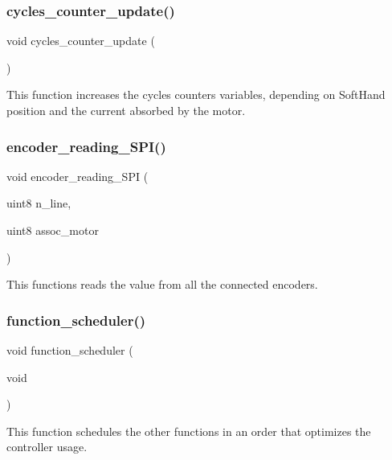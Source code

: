 \subsubsection{cycles\+\_\+counter\+\_\+update()}
{\footnotesize\ttfamily void cycles\+\_\+counter\+\_\+update (\begin{DoxyParamCaption}{ }\end{DoxyParamCaption})}

This function increases the cycles counters variables, depending on Soft\+Hand position and the current absorbed by the motor. \mbox{\label{interruptions_8h_a6eeedfdf03dd87bd2922b7005fd8c691}} 
\subsubsection{encoder\+\_\+reading\+\_\+\+S\+P\+I()}
{\footnotesize\ttfamily void encoder\+\_\+reading\+\_\+\+S\+PI (\begin{DoxyParamCaption}\item[{uint8}]{n\+\_\+line,  }\item[{uint8}]{assoc\+\_\+motor }\end{DoxyParamCaption})}

This functions reads the value from all the connected encoders. \mbox{\label{interruptions_8h_a39df971c4e9f194be50c54dfd7aeabfe}} 
\subsubsection{function\+\_\+scheduler()}
{\footnotesize\ttfamily void function\+\_\+scheduler (\begin{DoxyParamCaption}\item[{void}]{ }\end{DoxyParamCaption})}

This function schedules the other functions in an order that optimizes the controller usage. \mbox{\label{interruptions_8h_a9790811526002d99b25a814afd02cbae}} 
